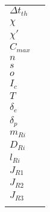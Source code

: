 \begin{longtable}[l]{@{}ll@{}}
    \( \Delta t_{th} \) & \\
    \( \chi \) & \\
    \( \chi' \) & \\
    \( C_{max} \) & \\
    \( n \) & \\
    \( s \) & \\
    \( o \) & \\
    \( I_c \) & \\
    \( T \) & \\
    \( \delta_e \) & \\
    \( \delta_p \) & \\
    \( m_{Ri} \) & \\
    \( D_{Ri} \) & \\
    \( l_{Ri} \) & \\
    \( J_{R1} \) & \\
    \( J_{R2} \) & \\
    \( J_{R3} \) & \\
    \(  \) & \\
\end{longtable}
\label{tab:glossar}